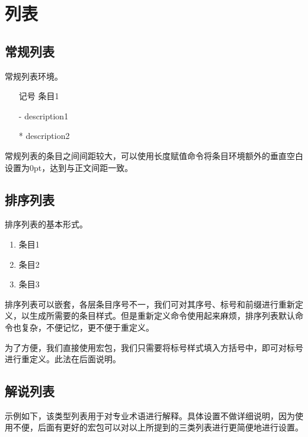 \section{列表}
\subsection{常规列表}
常规列表环境。

\begin{codeshow}
\begin{itemize}
	\item[记号] 条目1
	\item[-] description1
	\item[*] description2
\end{itemize}
\end{codeshow}

常规列表的条目之间间距较大，可以使用长度赋值命令将条目环境额外的垂直空白设置为0pt，达到与正文间距一致。

\begin{latex}{}
\itemsep=0pt
\parskip=0pt
\end{latex}

\subsection{排序列表}
排序列表的基本形式。

\begin{codeshow}
	\begin{enumerate}
		\item 条目1
		\item 条目2
		\item 条目3
	\end{enumerate}
\end{codeshow}

排序列表可以嵌套，各层条目序号不一，我们可对其序号、标号和前缀进行重新定义，以生成所需要的条目样式。但是重新定义命令使用起来麻烦，排序列表默认命令也复杂，不便记忆，更不便于重定义。

为了方便，我们直接使用宏包，我们只需要将标号样式填入方括号中，即可对标号进行重定义。此法在后面说明。

\subsection{解说列表}
示例如下，该类型列表用于对专业术语进行解释。具体设置不做详细说明，因为使用不便，后面有更好的宏包可以对以上所提到的三类列表进行更简便地进行设置。

